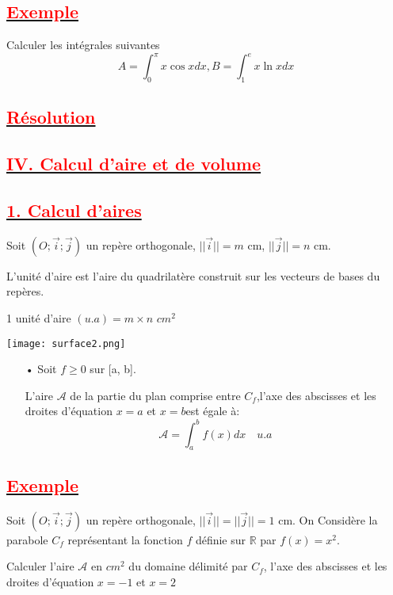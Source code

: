 \documentclass[12pt]{article}
\begin{document}
\subsection*{\underline{\textbf{\textcolor{red}{Exemple}}}}
Calculer les intégrales suivantes 
\[A=\int_{0}^{\pi}x\cos xdx, B=\int_{1}^{e}x\ln x dx\]
\subsection*{\underline{\textbf{\textcolor{red}{Résolution}}}}

\subsection*{\underline{\textbf{\textcolor{red}{IV. Calcul d'aire et de volume }}}}
\subsection*{\underline{\textbf{\textcolor{red}{1. Calcul d'aires}}}}

Soit $(O ; \vec{i} ; \vec{j})$ un repère orthogonale, $||\vec{i}||=m$ cm, $||\vec{j}||=n$ cm.

L'unité d'aire est l'aire du quadrilatère construit sur les vecteurs de bases du repères.

1 unité d'aire $(u.a)=m\times n$ $cm^{2}$

\begin{center}
   \texttt{[image: surface2.png]}
\end{center}
\begin{itemize}
\item[•] Soit $f\geq 0$ sur [a, b].

L'aire $\mathcal{A}$  de la partie du plan comprise entre $C_{f}$,l'axe des abscisses et les droites d'équation $x=a$ et $x=b$est égale à:
\[\mathcal{A}=\int_{a}^{b}f(x)dx\quad u.a\]
\end{itemize}
\subsection*{\underline{\textbf{\textcolor{red}{Exemple }}}}
Soit $(O ; \vec{i} ; \vec{j})$ un repère orthogonale, $||\vec{i}||=||\vec{j}||=1$ cm. On Considère la parabole $C_{f}$ représentant la fonction $f$ définie sur $\mathbb{R}$ par $f(x)=x^{2}$.

Calculer l'aire $\mathcal{A}$ en $cm^{2}$ du domaine délimité par $C_{f}$, l'axe des abscisses et les droites d'équation $x=-1$ et $x=2$
\end{document}

